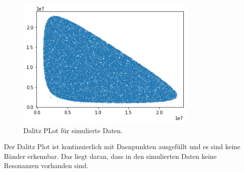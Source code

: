 \begin{figure}[htb]
  \centering
  \includegraphics[width=0.8\textwidth]{plots/sim_dalitz_plot_m12_m13.png}
  \caption{Dalitz PLot f\"ur simulierte Daten.}
  \label{fig:dalitzSim}
\end{figure}

Der Dalitz Plot ist kontinuierlich mit Daenpunkten ausgef\"ullt und es sind keine B\"ander erkennbar. Das liegt daran, dass in den simulierten Daten keine Resonanzen vorhanden sind.
